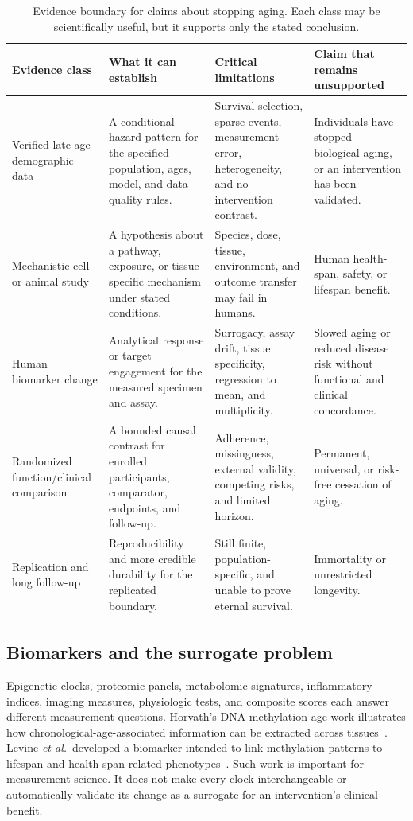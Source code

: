 \documentclass[10pt,conference]{IEEEtran}
\begin{document}
\begin{table}[!t]
\caption{Evidence boundary for claims about stopping aging. Each class may be scientifically useful, but it supports only the stated conclusion.}
\label{tab:claim-boundary}
\centering
\footnotesize
\begin{tabular}{@{}p{}p{}p{}p{}@{}}
\toprule
Evidence class & What it can establish & Critical limitations & Claim that remains unsupported \\
\midrule
Verified late-age demographic data & A conditional hazard pattern for the specified population, ages, model, and data-quality rules. & Survival selection, sparse events, measurement error, heterogeneity, and no intervention contrast. & Individuals have stopped biological aging, or an intervention has been validated. \\
Mechanistic cell or animal study & A hypothesis about a pathway, exposure, or tissue-specific mechanism under stated conditions. & Species, dose, tissue, environment, and outcome transfer may fail in humans. & Human health-span, safety, or lifespan benefit. \\
Human biomarker change & Analytical response or target engagement for the measured specimen and assay. & Surrogacy, assay drift, tissue specificity, regression to mean, and multiplicity. & Slowed aging or reduced disease risk without functional and clinical concordance. \\
Randomized function/clinical comparison & A bounded causal contrast for enrolled participants, comparator, endpoints, and follow-up. & Adherence, missingness, external validity, competing risks, and limited horizon. & Permanent, universal, or risk-free cessation of aging. \\
Replication and long follow-up & Reproducibility and more credible durability for the replicated boundary. & Still finite, population-specific, and unable to prove eternal survival. & Immortality or unrestricted longevity. \\
\bottomrule
\end{tabular}
\end{table}

\subsection{Biomarkers and the surrogate problem}

Epigenetic clocks, proteomic panels, metabolomic signatures, inflammatory indices, imaging measures, physiologic tests, and composite scores each answer different measurement questions. Horvath's DNA-methylation age work illustrates how chronological-age-associated information can be extracted across tissues~\cite{horvath2013}. Levine \emph{et al.}\ developed a biomarker intended to link methylation patterns to lifespan and health-span-related phenotypes~\cite{levine2018}. Such work is important for measurement science. It does not make every clock interchangeable or automatically validate its change as a surrogate for an intervention's clinical benefit.
\end{document}
